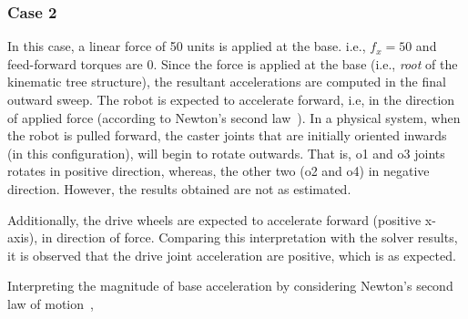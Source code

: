 \subsubsection*{Case 2}
\hspace{20pt}In this case, a linear force of 50 units is applied at the base. i.e., $f_x = 50$ and feed-forward torques are 0. Since the force is applied at the base (i.e., \textit{root} of the kinematic tree structure), the resultant accelerations are computed in the final outward sweep. The robot is expected to accelerate forward, i.e, in the direction of applied force (according to Newton's second law~\cite{newton1833philosophiae}). In a physical system, when the robot is pulled forward,  the caster joints that are initially oriented inwards (in this configuration), will begin to rotate outwards. That is, o1 and o3 joints rotates in positive direction, whereas, the other two (o2 and o4) in negative direction. However, the results obtained are not as estimated.  

Additionally, the drive wheels are expected to accelerate forward (positive x-axis), in direction of force. Comparing this interpretation with the solver results, it is observed that the drive joint acceleration are positive, which is as expected.

Interpreting the magnitude of base acceleration by considering Newton's second law of motion~\cite{newton1833philosophiae},





